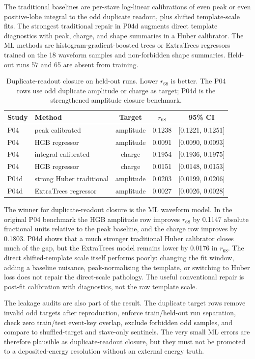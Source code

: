 The traditional baselines are per-stave log-linear calibrations of even peak
or even positive-lobe integral to the odd duplicate readout, plus shifted
template-scale fits.  The strongest traditional repair in P04d augments direct
template diagnostics with peak, charge, and shape summaries in a Huber
calibrator.  The ML methods are histogram-gradient-boosted trees or
ExtraTrees regressors trained on the 18 waveform samples and non-forbidden
shape summaries.  Held-out runs 57 and 65 are absent from training.

\begin{table}[H]
\centering
\caption{Duplicate-readout closure on held-out runs.  Lower \(r_{68}\) is
better.  The P04 rows use odd duplicate amplitude or charge as target; P04d is
the strengthened amplitude closure benchmark.}
\begin{tabular}{llccc}
\toprule
Study & Method & Target & \(r_{68}\) & 95\% CI \\
\midrule
P04 & peak calibrated & amplitude & 0.1238 & [0.1221, 0.1251] \\
P04 & HGB regressor & amplitude & 0.0091 & [0.0090, 0.0093] \\
P04 & integral calibrated & charge & 0.1954 & [0.1936, 0.1975] \\
P04 & HGB regressor & charge & 0.0151 & [0.0148, 0.0153] \\
P04d & strong Huber traditional & amplitude & 0.0203 & [0.0199, 0.0206] \\
P04d & ExtraTrees regressor & amplitude & 0.0027 & [0.0026, 0.0028] \\
\bottomrule
\end{tabular}
\label{tab:amplitude-closure}
\end{table}

The winner for duplicate-readout closure is the ML waveform model.  In the
original P04 benchmark the HGB amplitude row improves \(r_{68}\) by
0.1147 absolute fractional units relative to the peak baseline, and the charge
row improves by 0.1803.  P04d shows that a much stronger traditional Huber
calibrator closes much of the gap, but the ExtraTrees model remains lower by
0.0176 in \(r_{68}\).  The direct shifted-template scale itself performs
poorly: changing the fit window, adding a baseline nuisance, peak-normalising
the template, or switching to Huber loss does not repair the direct-scale
pathology.  The useful conventional repair is post-fit calibration with
diagnostics, not the raw template scale.

The leakage audits are also part of the result.  The duplicate target rows
remove invalid odd targets after reproduction, enforce train/held-out run
separation, check zero train/test event-key overlap, exclude forbidden odd
samples, and compare to shuffled-target and stave-only sentinels.  The very
small ML errors are therefore plausible as duplicate-readout closure, but they
must not be promoted to a deposited-energy resolution without an external
energy truth.

